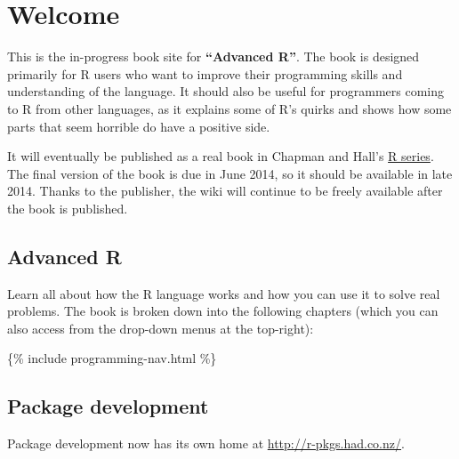 \chapter{Welcome}

This is the in-progress book site for \textbf{``Advanced R''}. The book
is designed primarily for R users who want to improve their programming
skills and understanding of the language. It should also be useful for
programmers coming to R from other languages, as it explains some of R's
quirks and shows how some parts that seem horrible do have a positive
side.

It will eventually be published as a real book in Chapman and Hall's
\href{http://www.crcpress.com/browse/series/crctherser}{R series}. The
final version of the book is due in June 2014, so it should be available
in late 2014. Thanks to the publisher, the wiki will continue to be
freely available after the book is published.

\section{Advanced R}

Learn all about how the R language works and how you can use it to solve
real problems. The book is broken down into the following chapters
(which you can also access from the drop-down menus at the top-right):

\{\% include programming-nav.html \%\}

\section{Package development}

Package development now has its own home at
\url{http://r-pkgs.had.co.nz/}.
